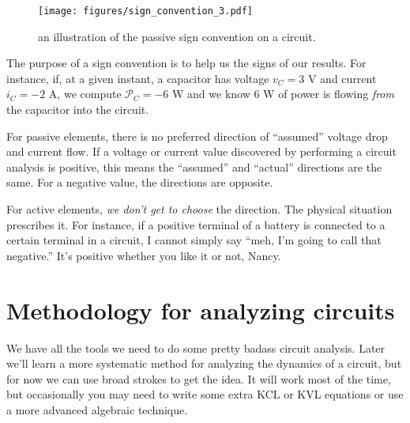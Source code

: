 \documentclass[electronics.tex]{subfiles}
\begin{document}
\begin{figure}[t]
	\centering
	\texttt{[image: figures/sign\_convention\_3.pdf]}
	\caption{an illustration of the passive sign convention on a circuit.}
	\label{fig:sign_convetion_3}
\end{figure}

The purpose of a sign convention is to help us  the signs of our results.
For instance, if, at a given instant, a capacitor has voltage $v_C = 3$ V and current $i_C = -2$ A, we compute $\mathcal{P}_C = -6$ W and we know $6$ W of power is flowing \emph{from} the capacitor into the circuit.

For passive elements, there is no preferred direction of ``assumed'' voltage drop and current flow.
If a voltage or current value discovered by performing a circuit analysis is positive, this means the ``assumed'' and ``actual'' directions are the same. For a negative value, the directions are opposite.

For active elements, \emph{we don't get to choose} the direction.
The physical situation prescribes it.
For instance, if a positive terminal of a battery is connected to a certain terminal in a circuit, I cannot simply say ``meh, I'm going to call that negative.''
It's positive whether you like it or not, Nancy.
\tags{}

\section{Methodology for analyzing circuits}
\tags{}
\label{lec:methodology_for_analyzing_circuits}

We have all the tools we need to do some pretty badass circuit analysis.
Later we'll learn a more systematic method for analyzing the dynamics of a circuit, but for now we can use broad strokes to get the idea.
It will work most of the time, but occasionally you may need to write some extra KCL or KVL equations or use a more advanced algebraic technique.
\end{document}
